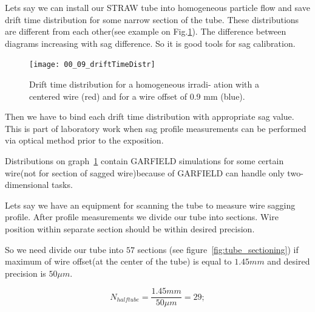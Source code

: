 	Lets say we can install our STRAW tube into homogeneous particle flow and save drift time distribution for some narrow section of the tube. These distributions are different from each other(see example on Fig.\ref{fig:DrftTimeDistr_00_09_comp}). The difference between diagrams increasing with sag difference. So it is good tools for sag calibration.
		
	\begin{figure}[h!]
	\centering
	\texttt{[image: 00\_09\_driftTimeDistr]}
	\caption{Drift time distribution for a homogeneous irradi-
ation with a centered wire (red) and for a wire offset of 0.9 mm (blue).}
	\label{fig:DrftTimeDistr_00_09_comp}	
	\end{figure}
	
	Then we have to bind each drift time distribution with appropriate sag value. This is part of laboratory work when sag profile measurements can be performed via optical method prior to the exposition.
	
	Distributions on graph~\ref{fig:DrftTimeDistr_00_09_comp} contain GARFIELD simulations for some certain wire(not for section of sagged wire)because of GARFIELD can handle only two-dimensional tasks.
	
	Lets say we have an equipment for scanning the tube to measure wire sagging profile. After profile measurements we divide our tube into sections. Wire position within separate section should be within desired precision.
	
	So we need divide our tube into $57$ sections (see figure~\ref{fig:tube_sectioning}) if maximum of wire offset(at the center of the tube) is equal to $1.45mm$ and desired precision is $50\mu m$.
	
	\begin{equation}
	N_{halftube} = \frac{1.45 mm}{50 \mu m} = 29;
	\label{eq:tube_sectioning}
	\end{equation}
	
